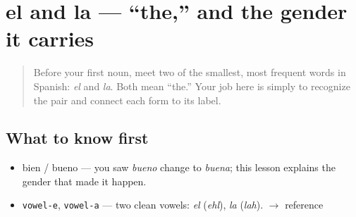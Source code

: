\section[el / la]{el and la — \textquotedblleft{}the,\textquotedblright{} and the gender it carries}

\label{lesson:ES-C01-el-la}



\begin{quote}
Before your first noun, meet two of the smallest, most frequent words in Spanish: \emph{el} and \emph{la}. Both mean \textquotedblleft{}the.\textquotedblright{} Your job here is simply to recognize the pair and connect each form to its label.
\end{quote}

\subsection*{What to know first}
\begin{itemize}
\raggedright
  \item bien / bueno — you saw \emph{bueno} change to \emph{buena}; this lesson explains the gender that made it happen.
\end{itemize}

\begin{sounds}
\begin{itemize}
\raggedright
  \item \texttt{vowel-e}, \texttt{vowel-a} — two clean vowels: \emph{el} (\emph{ehl}), \emph{la} (\emph{lah}). $\to$ reference
\end{itemize}
\end{sounds}


